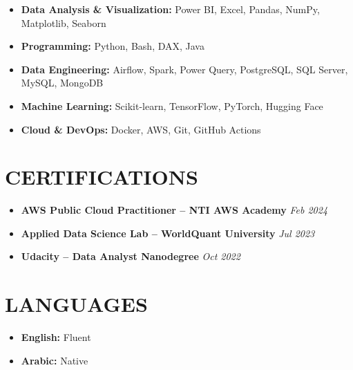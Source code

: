 \documentclass[11pt]{article}
\begin{document}
\begin{itemize}
\item \textbf{Data Analysis \& Visualization:} Power BI, Excel, Pandas, NumPy, Matplotlib, Seaborn
\item \textbf{Programming:} Python, Bash, DAX, Java
\item \textbf{Data Engineering:} Airflow, Spark, Power Query, PostgreSQL, SQL Server, MySQL, MongoDB
\item \textbf{Machine Learning:} Scikit-learn, TensorFlow, PyTorch, Hugging Face
\item \textbf{Cloud \& DevOps:} Docker, AWS, Git, GitHub Actions
\end{itemize}

\section{CERTIFICATIONS}
\begin{itemize}
\item \textbf{AWS Public Cloud Practitioner – NTI AWS Academy} \hfill \textit{Feb 2024}
\item \textbf{Applied Data Science Lab – WorldQuant University} \hfill \textit{Jul 2023}
\item \textbf{Udacity – Data Analyst Nanodegree} \hfill \textit{Oct 2022}
\end{itemize}

\section{LANGUAGES}

\begin{itemize}
\item \textbf{English:} Fluent
\item \textbf{Arabic:} Native
\end{itemize}
\end{document}
